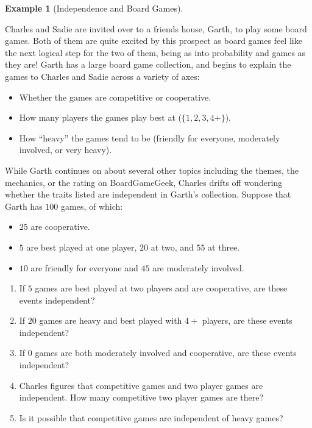 \documentclass[
  letterpaper,
  DIV=11,
  numbers=noendperiod]{scrreprt}
\providecommand{\tightlist}{%
  \setlength{\itemsep}{0pt}\setlength{\parskip}{0pt}}\usepackage{longtable,booktabs,array}
\theoremstyle{definition}
\theoremstyle{definition}
\theoremstyle{definition}
\newtheorem{example}{Example}[chapter]
\theoremstyle{remark}
\begin{document}
\begin{example}[Independence and Board
Games]\protect\hypertarget{exm-assessing-independence}{}\label{exm-assessing-independence}

Charles and Sadie are invited over to a friends house, Garth, to play
some board games. Both of them are quite excited by this prospect as
board games feel like the next logical step for the two of them, being
as into probability and games as they are! Garth has a large board game
collection, and begins to explain the games to Charles and Sadie across
a variety of axes:

\begin{itemize}
\tightlist
\item
  Whether the games are competitive or cooperative.
\item
  How many players the games play best at (\(\{1, 2, 3, 4+\}\)).
\item
  How ``heavy'' the games tend to be (friendly for everyone, moderately
  involved, or very heavy).
\end{itemize}

While Garth continues on about several other topics including the
themes, the mechanics, or the rating on BoardGameGeek, Charles drifts
off wondering whether the traits listed are independent in Garth's
collection. Suppose that Garth has \(100\) games, of which:

\begin{itemize}
\tightlist
\item
  \(25\) are cooperative.
\item
  \(5\) are best played at one player, \(20\) at two, and \(55\) at
  three.
\item
  \(10\) are friendly for everyone and \(45\) are moderately involved.
\end{itemize}

\begin{enumerate}
\def\labelenumi{\alph{enumi}.}
\tightlist
\item
  If \(5\) games are best played at two players and are cooperative, are
  these events independent?
\item
  If \(20\) games are heavy and best played with \(4+\) players, are
  these events independent?
\item
  If \(0\) games are both moderately involved and cooperative, are these
  events independent?
\item
  Charles figures that competitive games and two player games are
  independent. How many competitive two player games are there?
\item
  Is it possible that competitive games are independent of heavy games?
\end{enumerate}


\end{example}
\end{document}
